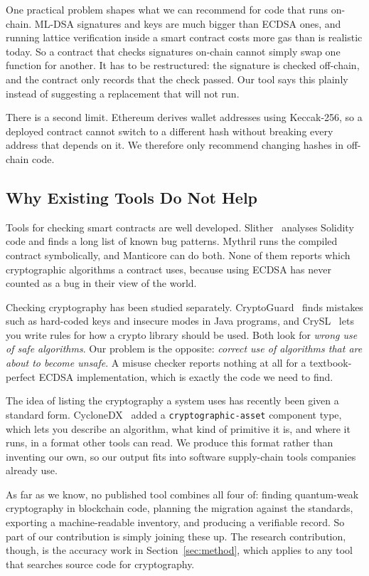 \documentclass[runningheads]{llncs}
\begin{document}
One practical problem shapes what we can recommend for code that runs on-chain.
ML-DSA signatures and keys are much bigger than ECDSA ones, and running lattice
verification inside a smart contract costs more gas than is realistic today. So
a contract that checks signatures on-chain cannot simply swap one function for
another. It has to be restructured: the signature is checked off-chain, and the
contract only records that the check passed. Our tool says this plainly instead
of suggesting a replacement that will not run.

There is a second limit. Ethereum derives wallet addresses using Keccak-256, so
a deployed contract cannot switch to a different hash without breaking every
address that depends on it. We therefore only recommend changing hashes in
off-chain code.

\subsection{Why Existing Tools Do Not Help}

Tools for checking smart contracts are well developed. Slither~\cite{slither}
analyses Solidity code and finds a long list of known bug patterns. Mythril
runs the compiled contract symbolically, and Manticore can do both. None of
them reports which cryptographic algorithms a contract uses, because using
ECDSA has never counted as a bug in their view of the world.

Checking cryptography has been studied separately.
CryptoGuard~\cite{cryptoguard} finds mistakes such as hard-coded keys and
insecure modes in Java programs, and CrySL~\cite{crysl} lets you write rules
for how a crypto library should be used. Both look for \emph{wrong use of safe
algorithms}. Our problem is the opposite: \emph{correct use of algorithms that
are about to become unsafe}. A misuse checker reports nothing at all for a
textbook-perfect ECDSA implementation, which is exactly the code we need to
find.

The idea of listing the cryptography a system uses has recently been given a
standard form. CycloneDX~\cite{cyclonedx} added a
\texttt{cryptographic-asset} component type, which lets you describe an
algorithm, what kind of primitive it is, and where it runs, in a format other
tools can read. We produce this format rather than inventing our own, so our
output fits into software supply-chain tools companies already use.

As far as we know, no published tool combines all four of: finding quantum-weak
cryptography in blockchain code, planning the migration against the standards,
exporting a machine-readable inventory, and producing a verifiable record. So
part of our contribution is simply joining these up. The research contribution,
though, is the accuracy work in Section~\ref{sec:method}, which applies to any
tool that searches source code for cryptography.
\end{document}
